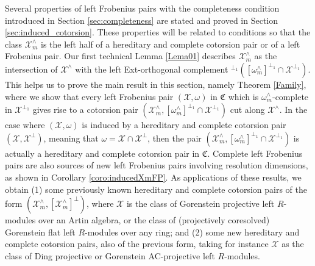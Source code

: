 \documentclass[10pt,reqno]{amsart}
\numberwithin{equation}{section}
\theoremstyle{remark}
\newcommand{\C}{\mathfrak{C}}
\newcommand{\X}{\mathcal{X}}
\begin{document}
Several properties of left Frobenius pairs with the completeness condition introduced in Section \ref{sec:completeness} are stated and proved in Section \ref{sec:induced_cotorsion}. These properties will be related to conditions so that the class $\X^\wedge_m$ is the left half of a hereditary and complete cotorsion pair or of a left Frobenius pair. Our first technical Lemma \ref{Lema01} describes $\X^\wedge_m$ as the intersection of $\X^\wedge$ with the left Ext-orthogonal complement ${}^{\perp_1}([\omega^\wedge_m]^{\perp_1} \cap \X^{\perp_1})$. This helps us to prove the main result in this section, namely Theorem \ref{Family}, where we show that every left Frobenius pair $(\X,\omega)$ in $\C$ which is $\omega^\wedge_m$-complete in $\X^{\perp_1}$ gives rise to a cotorsion pair $(\X^\wedge_m, [\omega^{\wedge}_m]^{\perp_1} \cap \X^{\perp_1})$ cut along $\X^{\wedge}$. In the case where $(\X,\omega)$ is induced by a hereditary and complete cotorsion pair $(\X,\X^\perp)$, meaning that $\omega = \X \cap \X^\perp$, then the pair $(\X^\wedge_m, [\omega^{\wedge}_m]^{\perp_1} \cap \X^{\perp_1})$ is actually a hereditary and complete cotorsion pair in $\C$. Complete left Frobenius pairs are also sources of new left Frobenius pairs involving resolution dimensions, as shown in Corollary \ref{coro:inducedXmFP}. As applications of these results, we obtain (1) some previously known hereditary and complete cotorsion pairs of the form $(\X^\wedge_m,[\X^\wedge_m]^{\perp})$, where $\X$ is the class of Gorenstein projective left $R$-modules over an Artin algebra, or the class of (projectively coresolved) Gorenstein flat left $R$-modules over any ring; and (2) some new hereditary and complete cotorsion pairs, also of the previous form, taking for instance $\X$ as the class of Ding projective or Gorenstein AC-projective left $R$-modules. 
\end{document}
